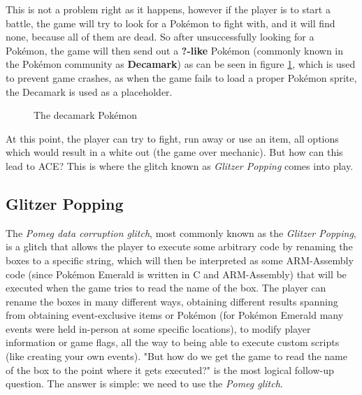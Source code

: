 \documentclass[a4paper]{usiinfbachelorproject}
\begin{document}
This is not a problem right as it happens, however if the player is to start a battle, the game will try to look for a Pokémon to fight with, and it will find none, because all of them are dead. So after unsuccessfully looking for a Pokémon, the game will then send out a \textbf{?-like} Pokémon (commonly known in the Pokémon community as \textbf{Decamark})\cite{decamark} as can be seen in figure \ref{fig:decamark}, which is used to prevent game crashes, as when the game fails to load a proper Pokémon sprite, the Decamark is used as a placeholder.

\begin{figure}[h!]
	\caption{The decamark Pokémon}\label{fig:decamark}
\end{figure}

At this point, the player can try to fight, run away or use an item, all options which would result in a white out (the game over mechanic). But how can this lead to ACE? This is where the glitch known as \textit{Glitzer Popping} comes into play.

\subsection{Glitzer Popping}
\label{sec:glitzer_popping}
The \textit{Pomeg data corruption glitch}, most commonly known as the \textit{Glitzer Popping}, is a glitch that allows the player to execute some arbitrary code by renaming the boxes to a specific string, which will then be interpreted as some ARM-Assembly code (since Pokémon Emerald is written in C and ARM-Assembly) that will be executed when the game tries to read the name of the box. The player can rename the boxes in many different ways, obtaining different results spanning from obtaining event-exclusive items or Pokémon (for Pokémon Emerald many events were held in-person at some specific locations), to modify player information or game flags, all the way to being able to execute custom scripts (like creating your own events). "But how do we get the game to read the name of the box to the point where it gets executed?" is the most logical follow-up question. The answer is simple: we need to use the \textit{Pomeg glitch}.
\end{document}
